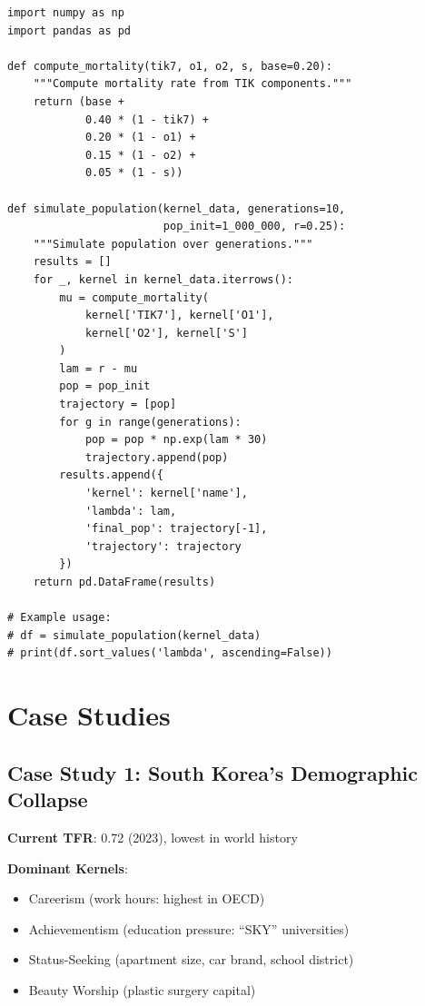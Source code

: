 \documentclass[11pt,a4paper]{article}
\theoremstyle{definition}
\theoremstyle{remark}
\begin{document}
\begin{verbatim}
import numpy as np
import pandas as pd

def compute_mortality(tik7, o1, o2, s, base=0.20):
    """Compute mortality rate from TIK components."""
    return (base + 
            0.40 * (1 - tik7) + 
            0.20 * (1 - o1) + 
            0.15 * (1 - o2) + 
            0.05 * (1 - s))

def simulate_population(kernel_data, generations=10, 
                        pop_init=1_000_000, r=0.25):
    """Simulate population over generations."""
    results = []
    for _, kernel in kernel_data.iterrows():
        mu = compute_mortality(
            kernel['TIK7'], kernel['O1'], 
            kernel['O2'], kernel['S']
        )
        lam = r - mu
        pop = pop_init
        trajectory = [pop]
        for g in range(generations):
            pop = pop * np.exp(lam * 30)
            trajectory.append(pop)
        results.append({
            'kernel': kernel['name'],
            'lambda': lam,
            'final_pop': trajectory[-1],
            'trajectory': trajectory
        })
    return pd.DataFrame(results)

# Example usage:
# df = simulate_population(kernel_data)
# print(df.sort_values('lambda', ascending=False))
\end{verbatim}

\section{Case Studies}
\label{app:case-studies}

\subsection{Case Study 1: South Korea's Demographic Collapse}

\textbf{Current TFR}: 0.72 (2023), lowest in world history

\textbf{Dominant Kernels}:
\begin{itemize}
    \item Careerism (work hours: highest in OECD)
    \item Achievementism (education pressure: ``SKY'' universities)
    \item Status-Seeking (apartment size, car brand, school district)
    \item Beauty Worship (plastic surgery capital)
\end{itemize}
\end{document}
